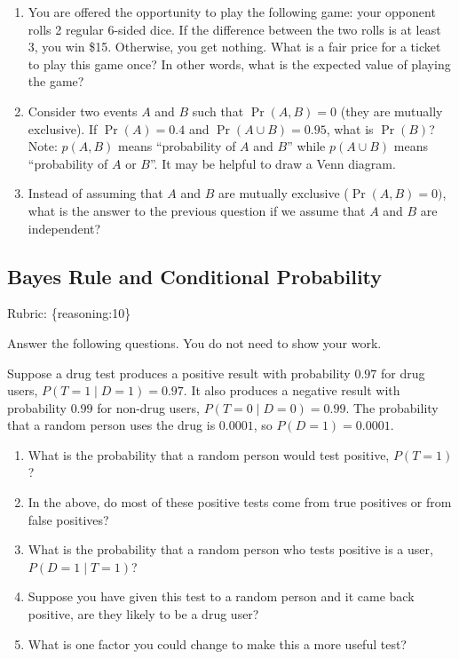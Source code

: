 \documentclass{article}
\def\rubric#1{\gre{Rubric: \{#1\}}}{}
\def\blu#1{{\color{blu}#1}}
\def\gre#1{{\color{gre}#1}}
\begin{document}
\begin{enumerate}
\item You are offered the opportunity to play the following game: your opponent rolls 2 regular 6-sided dice. If the difference between the two rolls is at least 3, you win \$15. Otherwise, you get nothing. What is a fair price for a ticket to play this game once? In other words, what is the expected value of playing the game?
\item Consider two events $A$ and $B$ such that $\Pr(A, B)=0$ (they are mutually exclusive). If $\Pr(A) = 0.4$ and $\Pr(A \cup B) = 0.95$, what is $\Pr(B)$? Note: $p(A, B)$ means
``probability of $A$ and $B$'' while $p(A \cup B)$ means ``probability of $A$ or $B$''. It may be helpful to draw a Venn diagram.
\item Instead of assuming that $A$ and $B$ are mutually exclusive ($\Pr(A,B) = 0)$, what is the answer to the previous question if we assume that $A$ and $B$ are independent?

\end{enumerate}

\subsection{Bayes Rule and Conditional Probability}
\rubric{reasoning:10}

\blu{Answer the following questions.} You do not need to show your work.

Suppose a drug test produces a positive result with probability $0.97$ for drug users, $P(T=1 \mid D=1)=0.97$. It also produces a negative result with probability $0.99$ for non-drug users, $P(T=0 \mid D=0)=0.99$. The probability that a random person uses the drug is $0.0001$, so $P(D=1)=0.0001$.

\begin{enumerate}
\item What is the probability that a random person would test positive, $P(T=1)$?
\item In the above, do most of these positive tests come from true positives or from false positives?
\item What is the probability that a random person who tests positive is a user, $P(D=1 \mid T=1)$?
\item Suppose you have given this test to a random person and it came back positive, are they likely to be a drug user?
\item What is one factor you could change to make this a more useful test?
\end{enumerate}
\end{document}
